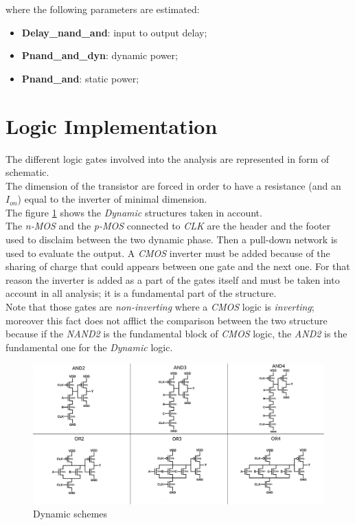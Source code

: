 \documentclass[12pt,  english, makeidx, a4paper, titlepage, oneside]{article}
\begin{document}
where the following parameters are estimated:

\begin{itemize}
\item \textbf{Delay\_nand\_and}: input to output delay;
\item \textbf{Pnand\_and\_dyn}: dynamic power;
\item \textbf{Pnand\_and}: static power;
\end{itemize}
 
\newpage 
\section{Logic Implementation}

\label{section:logicimplementation}
The different logic gates involved into the analysis are represented in form of schematic.\\
The dimension of the transistor are forced in order to have a resistance (and an $I_{on}$) equal to the inverter of minimal dimension. 
\\The figure  \ref{fig:DYNRID} shows the \textit{Dynamic} structures taken in account.\\
The \textit{n-MOS} and the \textit{p-MOS} connected to \textit{CLK} are the header and the footer used to disclaim between the two dynamic phase. Then a pull-down network is used to evaluate the output. A \textit{CMOS} inverter must be added because of the sharing of charge that could appears between one gate and the next one. For that reason the inverter is added as a part of the gates itself and must be taken into account in all analysis; it is a fundamental part of the structure.\\
Note that those gates are \textit{non-inverting} where a \textit{CMOS} logic is \textit{inverting}; moreover this fact does not afflict the comparison between the two structure because if the \textit{NAND2} is the fundamental block of \textit{CMOS} logic, the \textit{AND2} is the fundamental
one for the \textit{Dynamic} logic.\\
\begin{figure}[htbp]
\begin{center}
\includegraphics[width=19cm]{img/DYN_GRID.jpg}
\caption{Dynamic schemes}
\label{fig:DYNRID}
\end{center}
\end{figure}
\end{document}

